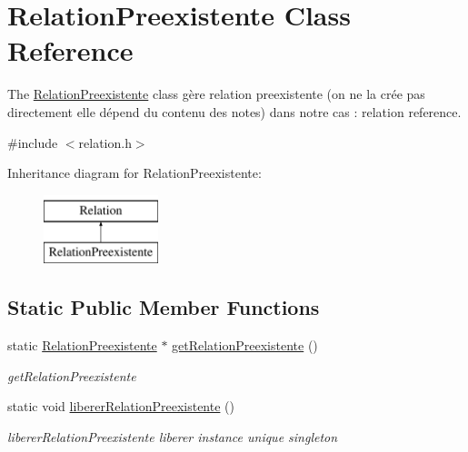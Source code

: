 \hypertarget{class_relation_preexistente}{}\section{Relation\+Preexistente Class Reference}
\label{class_relation_preexistente}


The \hyperlink{class_relation_preexistente}{Relation\+Preexistente} class gère relation preexistente (on ne la crée pas directement elle dépend du contenu des notes) dans notre cas \+: relation reference.  




{\ttfamily \#include $<$relation.\+h$>$}

Inheritance diagram for Relation\+Preexistente\+:\begin{figure}[H]
\begin{center}
\leavevmode
\includegraphics[height=2.000000cm]{class_relation_preexistente}
\end{center}
\end{figure}
\subsection*{Static Public Member Functions}
\begin{DoxyCompactItemize}
\item 
static \hyperlink{class_relation_preexistente}{Relation\+Preexistente} $\ast$ \hyperlink{class_relation_preexistente_afd2c7ee8104d9dee00b52e5af1f5ed59}{get\+Relation\+Preexistente} ()
\begin{DoxyCompactList}\small\item\em get\+Relation\+Preexistente \end{DoxyCompactList}\item 
\mbox{\label{class_relation_preexistente_ab6d6d23dc7edfb6773c56ffad69baf8f}} 
static void \hyperlink{class_relation_preexistente_ab6d6d23dc7edfb6773c56ffad69baf8f}{liberer\+Relation\+Preexistente} ()
\begin{DoxyCompactList}\small\item\em liberer\+Relation\+Preexistente liberer instance unique singleton \end{DoxyCompactList}\end{DoxyCompactItemize}
